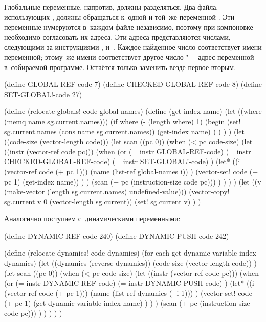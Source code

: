 Глобальные переменные, напротив, должны разделяться. Два файла, использующих
, должны обращаться к~одной и той~же переменной . Эти переменные
нумеруются в~каждом файле независимо, поэтому при компоновке необходимо
согласовать их адреса. Эти адреса представляются числами, следующими за
инструкциями ,  и~. Каждое
найденное число соответствует имени переменной; этому~же имени соответствует
другое число "--- адрес переменной в~собираемой программе. Остаётся только
заменить везде первое вторым.

\begin{code:lisp}
(define GLOBAL-REF-code         7)
(define CHECKED-GLOBAL-REF-code 8)
(define SET-GLOBAL!-code       27)

(define (relocate-globals! code global-names)
  (define (get-index name)
    (let ((where (memq name sg.current.names)))
      (if where (- (length where) 1)
          (begin (set! sg.current.names (cons name sg.current.names))
                 (get-index name) ) ) ) )
  (let ((code-size (vector-length code)))
    (let scan ((pc 0))
      (when (< pc code-size)
        (let ((instr (vector-ref code pc)))
          (when (or (= instr GLOBAL-REF-code)
                    (= instr CHECKED-GLOBAL-REF-code)
                    (= instr SET-GLOBAL!-code) )
            (let* ((i (vector-ref code (+ pc 1)))
                   (name (list-ref global-names i)) )
              (vector-set! code (+ pc 1) (get-index name)) ) )
          (scan (+ pc (instruction-size code pc))) ) ) ) )
  (let ((v (make-vector (length sg.current.names) undefined-value)))
    (vector-copy! sg.current v 0 (vector-length sg.current))
    (set! sg.current v) ) )
\end{code:lisp}


Аналогично поступаем с~динамическими переменными:

\begin{code:lisp}
(define DYNAMIC-REF-code 240)
(define DYNAMIC-PUSH-code 242)

(define (relocate-dynamics! code dynamics)
  (for-each get-dynamic-variable-index dynamics)
  (let ((dynamics (reverse dynamics))
        (code size (vector-length code)) )
    (let scan ((pc 0))
      (when (< pc code-size)
        (let ((instr (vector-ref code pc)))
          (when (or (= instr DYNAMIC-REF-code)
                    (= instr DYNAMIC-PUSH-code) )
            (let* ((i (vector-ref code (+ pc 1)))
                   (name (list-ref dynamics (- i 1))) )
              (vector-set! code (+ pc 1)
                           (get-dynamic-variable-index name) ) ) )
          (scan (+ pc (instruction-size code pc))) ) ) ) ) )
\end{code:lisp}

